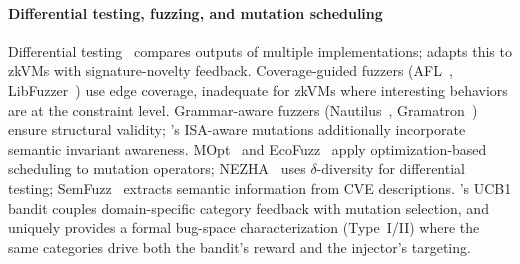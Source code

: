 \paragraph{Differential testing, fuzzing, and mutation scheduling}
Differential testing~\cite{mckeeman1998differential,csmith} compares outputs of multiple implementations; \tool adapts this to zkVMs with signature-novelty feedback. Coverage-guided fuzzers (AFL~\cite{afl}, LibFuzzer~\cite{libfuzzer}) use edge coverage, inadequate for zkVMs where interesting behaviors are at the constraint level. Grammar-aware fuzzers (Nautilus~\cite{nautilus}, Gramatron~\cite{gramatron}) ensure structural validity; \tool's ISA-aware mutations additionally incorporate semantic invariant awareness. MOpt~\cite{mopt} and EcoFuzz~\cite{ecofuzz} apply optimization-based scheduling to mutation operators; NEZHA~\cite{nezha} uses $\delta$-diversity for differential testing; SemFuzz~\cite{semfuzz} extracts semantic information from CVE descriptions. \tool's UCB1 bandit couples domain-specific category feedback with mutation selection, and uniquely provides a formal bug-space characterization (Type~I/II) where the same categories drive both the bandit's reward and the injector's targeting.
